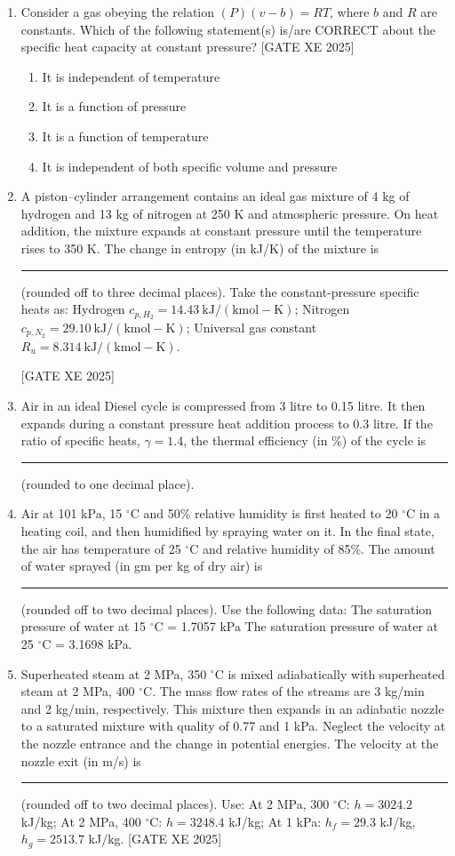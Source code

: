 \documentclass[journal,12pt,onecolumn]{IEEEtran}
\theoremstyle{remark}
\begin{document}
\begin{enumerate}
\item Consider a gas obeying the relation $(P)(v-b)=RT$, where $b$ and $R$ are constants. Which of the following statement(s) is/are CORRECT about the specific heat capacity at constant pressure?
\hfill[GATE XE 2025]
\begin{multicols}{2}
\begin{enumerate}
\item It is independent of temperature
\item It is a function of pressure
\item It is a function of temperature
\item It is independent of both specific volume and pressure
\end{enumerate}
\end{multicols}

\item A piston–cylinder arrangement contains an ideal gas mixture of 4 kg of hydrogen and 13 kg of nitrogen at 250 K and atmospheric pressure. On heat addition, the mixture expands at constant pressure until the temperature rises to 350 K. The change in entropy (in kJ/K) of the mixture is \rule{3cm}{0.15mm} (rounded off to three decimal places). Take the constant-pressure specific heats as: Hydrogen $c_{p,H_2}=14.43\ \mathrm{kJ/(kmol\!-\!K)}$; Nitrogen $c_{p,N_2}=29.10\ \mathrm{kJ/(kmol\!-\!K)}$; Universal gas constant $R_u=8.314\ \mathrm{kJ/(kmol\!-\!K)}$.

\hfill[GATE XE 2025]

\item Air in an ideal Diesel cycle is compressed from 3 litre to 0.15 litre. It then expands during a constant pressure heat addition process to 0.3 litre. If the ratio of specific heats, $\gamma=1.4$, the thermal efficiency (in \%) of the cycle is \rule{3cm}{0.15mm} (rounded to one decimal place).

\item Air at 101 kPa, 15 $^\circ$C and 50\% relative humidity is first heated to 20 $^\circ$C in a heating coil, and then humidified by spraying water on it. In the final state, the air has temperature of 25 $^\circ$C and relative humidity of 85\%. The amount of water sprayed (in gm per kg of dry air) is \rule{3cm}{0.15mm}(rounded off to two decimal places).
Use the following data:
The saturation pressure of water at 15 $^\circ$C = 1.7057 kPa
The saturation pressure of water at 25 $^\circ$C = 3.1698 kPa.

\item Superheated steam at 2 MPa, 350 $^\circ$C is mixed adiabatically with superheated steam at 2 MPa, 400 $^\circ$C. The mass flow rates of the streams are 3 kg/min and 2 kg/min, respectively. This mixture then expands in an adiabatic nozzle to a saturated mixture with quality of 0.77 and 1 kPa. Neglect the velocity at the nozzle entrance and the change in potential energies. The velocity at the nozzle exit (in m/s) is \rule{3cm}{0.15mm} (rounded off to two decimal places). Use: At 2 MPa, 300 $^\circ$C: $h=3024.2$ kJ/kg; At 2 MPa, 400 $^\circ$C: $h=3248.4$ kJ/kg; At 1 kPa: $h_f=29.3$ kJ/kg, $h_g=2513.7$ kJ/kg.
\hfill[GATE XE 2025]


\end{enumerate}
\end{document}
